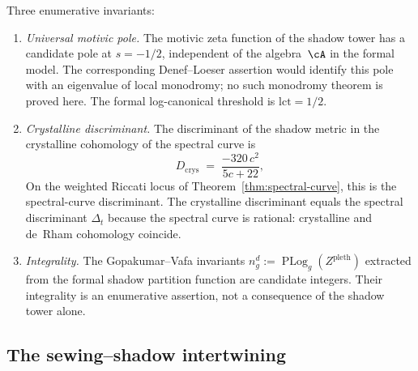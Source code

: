 \begin{remark}
Three enumerative invariants:
\begin{enumerate}[label=\textup{(\roman*)}]
\item \emph{Universal motivic pole.}
 The motivic zeta function of the shadow tower has a
 candidate pole at $s = -1/2$, independent of the
 algebra~$\cA$ in the formal model. The corresponding
 Denef--Loeser assertion would identify this pole with an
 eigenvalue of local monodromy; no such monodromy theorem is proved
 here. The formal log-canonical threshold is
 $\mathrm{lct}=1/2$.
\item \emph{Crystalline discriminant.}
 The discriminant of the shadow metric in the
 crystalline cohomology of the spectral curve is
 \begin{equation}\label{eq:crystalline-discriminant}
 D_{\mathrm{crys}}
 \;=\;
 \frac{-320\,c^2}{5c + 22},
 \end{equation}
 On the weighted Riccati locus of
 Theorem~\textup{\ref{thm:spectral-curve}}, this is the
 spectral-curve discriminant. The
 crystalline discriminant equals the spectral
 discriminant $\Delta_t$ because the spectral curve is
 rational: crystalline and de~Rham cohomology coincide.
\item \emph{Integrality.}
 The Gopakumar--Vafa invariants
 $n_g^d := \operatorname{PLog}_g(Z^{\mathrm{pleth}})$
 extracted from the formal shadow partition function are candidate
 integers. Their integrality is an enumerative assertion, not a
 consequence of the shadow tower alone.
\end{enumerate}
\end{remark}

\subsection{The sewing--shadow intertwining}
\label{subsec:sewing-shadow-intertwining}

